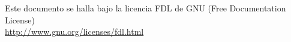 \documentclass[a4paper,12pt]{article}
\begin{document}

\pagebreak




\vspace{0.75cm}

\begin{center}
{\footnotesize Este documento se halla bajo la licencia FDL de GNU (Free Documentation
  License)\\ \url{http://www.gnu.org/licenses/fdl.html} }   
\end{center}
\end{document}
